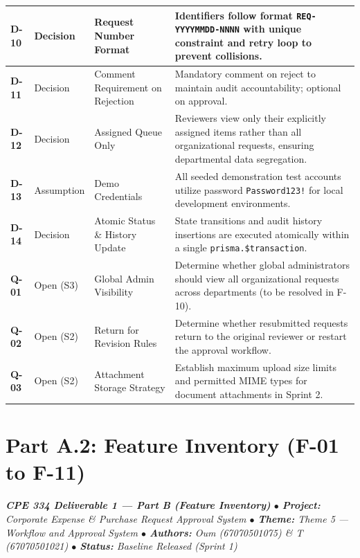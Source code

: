 \documentclass[11pt,a4paper]{article}
\begin{document}
\begin{longtable}{|>{\RaggedRight}p{1.4cm}|>{\centering\arraybackslash}p{2.0cm}|>{\RaggedRight}p{3.8cm}|>{\RaggedRight}p{7.5cm}|}
\textbf{D-10} & Decision & Request Number Format & Identifiers follow format \texttt{REQ-\allowbreak YYYYMMDD-\allowbreak NNNN} with unique constraint and retry loop to prevent collisions. \\ \hline
\textbf{D-11} & Decision & Comment Requirement on Rejection & Mandatory comment on reject to maintain audit accountability; optional on approval. \\ \hline
\textbf{D-12} & Decision & Assigned Queue Only & Reviewers view only their explicitly assigned items rather than all organizational requests, ensuring departmental data segregation. \\ \hline
\textbf{D-13} & Assumption & Demo Credentials & All seeded demonstration test accounts utilize password \texttt{Password123!} for local development environments. \\ \hline
\textbf{D-14} & Decision & Atomic Status \& History Update & State transitions and audit history insertions are executed atomically within a single \texttt{prisma.\allowbreak \$transaction}. \\ \hline
\textbf{Q-01} & Open (S3) & Global Admin Visibility & Determine whether global administrators should view all organizational requests across departments (to be resolved in F-10). \\ \hline
\textbf{Q-02} & Open (S2) & Return for Revision Rules & Determine whether resubmitted requests return to the original reviewer or restart the approval workflow. \\ \hline
\textbf{Q-03} & Open (S2) & Attachment Storage Strategy & Establish maximum upload size limits and permitted MIME types for document attachments in Sprint 2. \\ \hline
\end{longtable}
\vspace{0.3em}
\newpage
\section{Part A.2: Feature Inventory (F-01 to F-11)}\label{sec:part-a-feat}

\begin{tcolorbox}[colback=lightbg,colframe=secondary,arc=2mm,boxrule=0.8pt]\small\itshape
\textbf{CPE 334 Deliverable 1 — Part B (Feature Inventory)} \quad $\bullet$ \quad \textbf{Project:} Corporate Expense \& Purchase Request Approval System \quad $\bullet$ \quad \textbf{Theme:} Theme 5 — Workflow and Approval System \quad $\bullet$ \quad \textbf{Authors:} Oum (67070501075) \& T (67070501021) \quad $\bullet$ \quad \textbf{Status:} Baseline Released (Sprint 1)
\end{tcolorbox}
\end{document}
